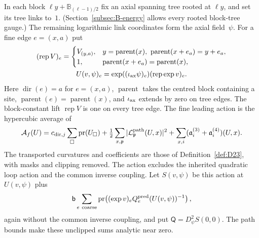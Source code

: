 In each block $\ell y+\mathbb B_{(\ell-1)/2}$ fix an axial spanning tree rooted at $\ell y$, and set its tree links to~$1$. (Section~\ref{subsec:B-energy} allows every rooted block-tree gauge.) The remaining logarithmic link coordinates form the axial field~$\psi$. For a fine edge $e=(x,a)$ put
\begin{gather*}
(\operatorname{rep}V)_e=\begin{cases}
V_{(y,a)},&y=\operatorname{parent}(x),\ \operatorname{parent}(x+e_a)=y+e_a,\\
1,&\operatorname{parent}(x+e_a)=\operatorname{parent}(x),
\end{cases}\\
U(v,\psi)_e=\exp((\iota_{\rm ax}\psi)_e)(\operatorname{rep}\exp v)_e.
\end{gather*}
Here $\operatorname{dir}(e)=a$ for $e=(x,a)$, $\operatorname{parent}$ takes the centred block containing a site, $\operatorname{parent}(e)=\operatorname{parent}(x)$, and $\iota_{\rm ax}$ extends by zero on tree edges. The block-constant lift $\operatorname{rep}V$ is one on every tree edge. The fine leading action is the hypercubic average of
\begin{equation*}
\mathcal A_f(U)=c_{{\rm dir},j}\sum_\square\operatorname{pr}(U_\square)
 +\tfrac12\sum_{x,\mathfrak p}|\mathcal L_{\mathfrak p}^{\rm path}(U,x)|^2
 +\sum_{x,i}(\mathfrak a_i^{(3)}+\mathfrak a_i^{(4)})(U,x).
\end{equation*}
The transported curvatures and coefficients are those of Definition~\ref{def:D23}, with masks and clipping removed. The action excludes the inherited quadratic loop action and the common inverse coupling. Let $S(v,\psi)$ be this action at $U(v,\psi)$ plus
\begin{equation*}
\mathsf{b}\sum_{e\ {\rm coarse}}\operatorname{pr}\bigl((\exp v)_eQ_e^{\rm pred}(U(v,\psi))^{-1}\bigr)\,,
\end{equation*}
again without the common inverse coupling, and put $\mathsf Q=D_\psi^2S(0,0)$. The path bounds make these unclipped sums analytic near zero.

